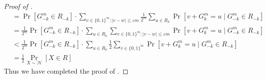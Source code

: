 \documentclass{toc}
\newcommand{\Cond}{\;\Big|\;}
\newcommand{\follows}{\ensuremath{\sim}}
\newcommand{\zo}{\ensuremath{ \{ 0, 1 \} }}
\newcommand{\gap}{\ensuremath{\varepsilon}}
\begin{document}
\begin{proof}[Proof of ]
\begin{align*}
			&= \Pr\left[ G^m_{-k}\in R_{-k} \right]
			\cdot \sum_{v\in\zo^m: \left|v-w\right|\le \gap m }\frac{1}{2^m} \sum_{u\in R_k}\Pr\left[ v+ G^m_k = u \Cond G^m_{-k}\in R_{-k}  \right]\\
			&= \frac{1}{2^m}  \Pr\left[ G^m_{-k}\in R_{-k} \right]
			\cdot \sum_{u\in R_k} \sum_{v\in\zo^m: \left|v-w\right|\le \gap m }\Pr\left[ v+ G^m_k = u \Cond G^m_{-k}\in R_{-k}  \right]\\
			&< \frac{1}{2^m}  \Pr\left[ G^m_{-k}\in R_{-k} \right]
			\cdot \sum_{u\in R_k} \frac{1}{2}\sum_{v\in\zo^m}\Pr\left[ v+ G^m_k = u \Cond G^m_{-k}\in R_{-k}  \right]\\
			&=\frac{1}{2} \Pr_{X\follows \mathcal{H}}\left[ X\in R\right]
		\end{align*}
%
Thus we have completed the proof of .
	\end{proof}

\end{document}
